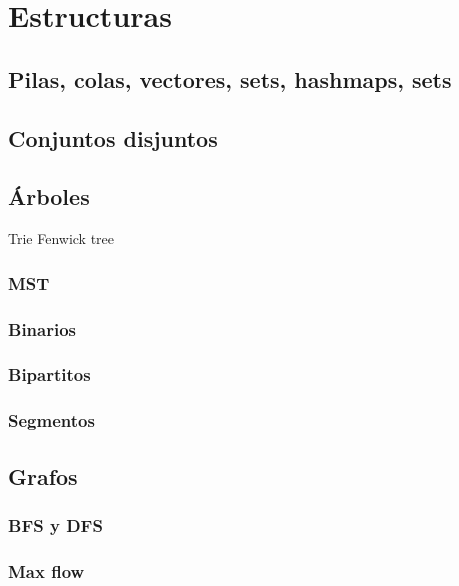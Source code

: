 \chapter{Estructuras}
\section{Pilas, colas, vectores, sets, hashmaps, sets}

\section{Conjuntos disjuntos}

\section{Árboles}
Trie
Fenwick tree
\subsection{MST}
\subsection{Binarios}
\subsection{Bipartitos}
\subsection{Segmentos}

\section{Grafos}
\subsection{BFS y DFS}
\subsection{Max flow}
